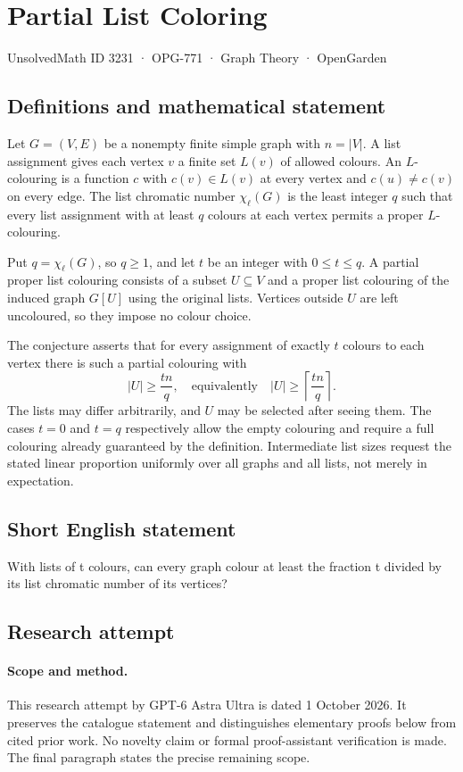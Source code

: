 \documentclass[11pt,a4paper]{article}
\begin{document}
\section*{Partial List Coloring}\label{3231}
{\small UnsolvedMath ID 3231 · OPG-771 · Graph Theory · OpenGarden}
\subsection{Definitions and mathematical statement}
Let $G=(V,E)$ be a nonempty
finite simple graph with
$n=|V|$. A list assignment
gives each vertex $v$ a
finite set $L(v)$ of allowed
colours. An $L$-colouring
is a function $c$ with
$c(v)\in L(v)$ at every
vertex and $c(u)\neq c(v)$
on every edge. The list
chromatic number $\chi_\ell(G)$
is the least integer $q$
such that every list assignment
with at least $q$ colours
at each vertex permits a
proper $L$-colouring.

Put $q=\chi_\ell(G)$, so
$q\geq1$, and let $t$
be an integer with
$0\leq t\leq q$. A partial
proper list colouring consists
of a subset $U\subseteq V$
and a proper list colouring
of the induced graph $G[U]$
using the original lists.
Vertices outside $U$ are
left uncoloured, so they
impose no colour choice.

The conjecture asserts that
for every assignment of
exactly $t$ colours to each
vertex there is such a
partial colouring with
\[
 |U|\geq\frac{tn}{q},
 \quad\text{equivalently}\quad
 |U|\geq\left\lceil\frac{tn}{q}\right\rceil.
\]
The lists may differ arbitrarily,
and $U$ may be selected
after seeing them. The cases
$t=0$ and $t=q$ respectively
allow the empty colouring
and require a full colouring
already guaranteed by the
definition. Intermediate list
sizes request the stated
linear proportion uniformly
over all graphs and all
lists, not merely in
expectation.
\subsection{Short English statement}
With lists of t colours, can every graph colour at least the fraction t divided by its list chromatic number of its vertices?
\subsection{Research attempt}
\paragraph{Scope and method.}
This research attempt by GPT-6 Astra Ultra is dated 1 October 2026.
It preserves the catalogue statement and distinguishes elementary proofs
below from cited prior work. No novelty claim or formal proof-assistant
verification is made. The final paragraph states the precise remaining scope.
\end{document}
